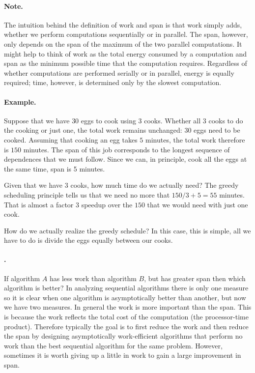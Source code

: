 \paragraph{Note.}
The intuition behind the definition of work and span is that work
simply adds, whether we perform computations sequentially or in
parallel.  The span, however, only depends on the span of the maximum
of the two parallel computations.  It might help to think of work as
the total energy consumed by a computation and span as the minimum
possible time that the computation requires.  Regardless of whether
computations are performed serially or in parallel, energy is equally
required; time, however, is determined only by the slowest
computation.

\paragraph{Example.}
Suppose that we have $30$ eggs to cook using $3$ cooks.  Whether all
$3$ cooks to do the cooking or just one, the total work remains
unchanged: $30$ eggs need to be cooked.
%
Assuming that cooking an egg takes $5$ minutes, the total work
therefore is $150$ minutes.
%
The span of this job corresponds to the longest sequence of
dependences that we must follow.
%
Since we can, in principle, cook all the eggs at the same time, 
span is 5 minutes.
%

Given that we have $3$ cooks, how much time do we actually need?
%
The greedy scheduling principle tells us that we need no more that
$150/3 + 5 = 55$ minutes. That is almost a factor $3$ speedup over the
$150$ that we would need with just one cook. 
%

How do we actually realize the greedy schedule?  In this case, this is
simple, all we have to do is divide the eggs equally between our
cooks.

\paragraph{.}
If algorithm $A$ has less work than algorithm $B$, but has greater
span then which algorithm is better?  In analyzing sequential
algorithms there is only one measure so it is clear when one algorithm
is asymptotically better than another, but now we have two measures.
In general the work is more important than the span.  
%
This is because the work reflects the total cost of the computation
(the processor-time product).  Therefore typically the goal is to
first reduce the work and then reduce the span by designing
asymptotically work-efficient algorithms that perform no work
than the best sequential algorithm for the same problem. 
%
However, sometimes it is worth giving up a little in work to gain a
large improvement in span.
%


